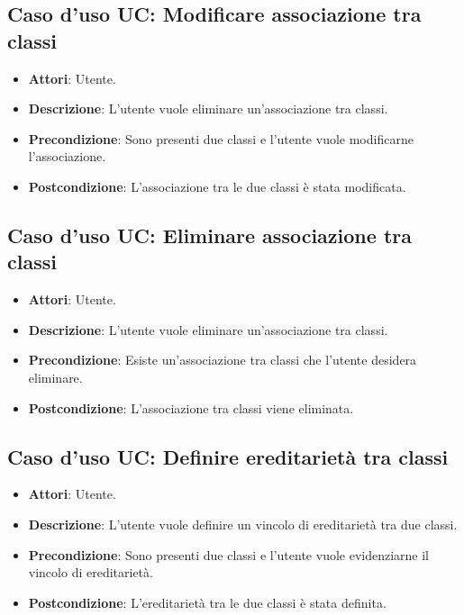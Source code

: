 \documentclass[../AnalisiDeiRequisiti.tex]{subfiles}
\begin{document}
		\subsection{Caso d'uso UC: Modificare associazione tra classi}
		\begin{itemize}
			\item\textbf{Attori}: Utente.
			\item\textbf{Descrizione}: L'utente vuole eliminare un'associazione tra classi.
			\item\textbf{Precondizione}: Sono presenti due classi e l'utente vuole modificarne l'associazione.
			\item\textbf{Postcondizione}: L'associazione tra le due classi è stata modificata.
		\end{itemize}
		
		\subsection{Caso d'uso UC: Eliminare associazione tra classi}
		\begin{itemize}
			\item\textbf{Attori}: Utente.
			\item\textbf{Descrizione}: L'utente vuole eliminare un'associazione tra classi.
			\item\textbf{Precondizione}: Esiste un'associazione tra classi che l'utente desidera eliminare.
			\item\textbf{Postcondizione}: L'associazione tra classi viene eliminata.
		\end{itemize}
		
		\subsection{Caso d'uso UC: Definire ereditarietà tra classi}
		\begin{itemize}
			\item\textbf{Attori}: Utente.
			\item\textbf{Descrizione}: L'utente vuole definire un vincolo di ereditarietà tra due classi.
			\item\textbf{Precondizione}: Sono presenti due classi e l'utente vuole evidenziarne il vincolo di ereditarietà.
			\item\textbf{Postcondizione}: L'ereditarietà tra le due classi è stata definita.
		\end{itemize}
		
\end{document}
